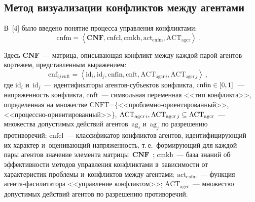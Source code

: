 \begin{multicols}{2}
     \vspace*{-8pt}
     
\section{Метод визуализации конфликтов между агентами} 

\vspace*{-2pt}
  
  В~[4] было введено понятие процесса управления конфликтами: 
  \begin{equation*}
  \mathrm{cnfm}=\left\langle \mathbf{CNF}, \mathrm{cnfcl}, \mathrm{cmkb}, 
  \mathrm{act_{cnfm}}, 
\mathrm{ACT_{agcr}}\right\rangle\,.
  \end{equation*}

\pagebreak

\noindent
Здесь $\mathbf{CNF}$~--- матрица, описывающая конфликт между каждой парой 
агентов кортежем, представленным выражением:
\begin{equation*}
  \mathrm{cnf}_{ij\,\mathrm{cnft}}=\left\langle \mathrm{id}_i, \mathrm{id}_j, 
  \mathrm{cnfin}, \mathrm{cnft}, \mathrm{ACT}_{\mathrm{agcr}\,i}, 
\mathrm{ACT}_{\mathrm{agcr}\,j}\right\rangle\,,
  \end{equation*}
где $\mathrm{id}_i$ и~$\mathrm{id}_j$~--- идентификаторы аген\-тов-субъ\-ек\-тов конфликта, 
$\mathrm{cnfin}\hm\in [0,1]$~--- напряженность конфликта, $\mathrm{cnft}$~--- символьная 
переменная <<тип конфликта>>, определенная на множестве 
$\mathrm{CNFT}$\;=\;\{<<проб\-лем\-но-ори\-ен\-ти\-ро\-ван\-ный>>, 
<<про\-цес\-сно-ори\-ен\-ти\-ро\-ван\-ный>>\}, $\mathrm{ACT}_{\mathrm{agcr}\,i}, \mathrm{ACT}_{\mathrm{agcr}\,j}\hm\subseteq 
\mathrm{ACT}_{\mathrm{agcr}}$~--- множества до\-пус\-ти\-мых действий агентов~$\mathrm{ag}_i$ и~$\mathrm{ag}_j$ по 
разрешению противоречий;\linebreak
  $\mathrm{cnfcl}$~--- 
классификатор конфликтов агентов, идентифицирующий их характер 
и~оценивающий напряженность, т.\,е.\ фор\-ми\-ру\-ющий для каж\-дой пары 
агентов значение элемента мат\-ри\-цы~$\mathbf{CNF}$~\cite{5-rum}; $\mathrm{cmkb}$~--- 
база знаний об эффективности методов управ\-ле\-ния конфликтами 
в~зависимости от характеристик проб\-ле\-мы и~конфликтов между агентами; 
$\mathrm{act_{cnfm}}$~--- функция  
аген\-та-фа\-си\-ли\-та\-то\-ра <<управ\-ле\-ние конфликтом>>; $\mathrm{ACT_{agcr}}$~--- 
множество до\-пус\-ти\-мых действий агентов по разрешению противоречий.
  

\end{multicols}
